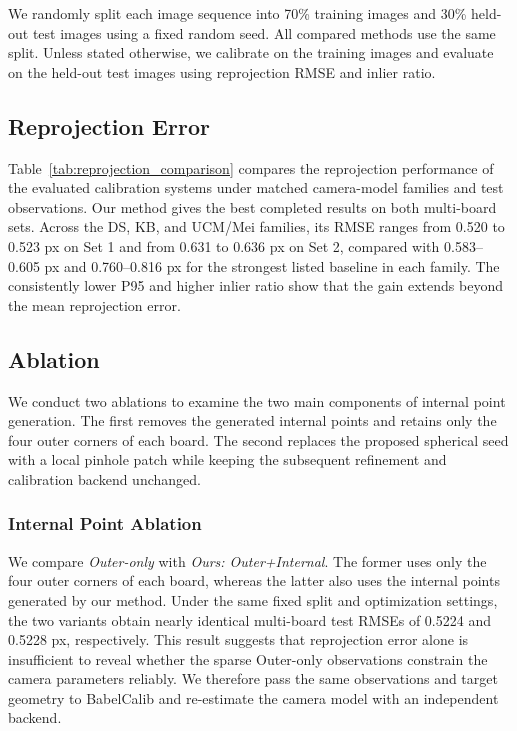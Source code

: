 \documentclass[letterpaper, 10 pt, conference]{ieeeconf}  %
\begin{document}
We randomly split each image sequence into 70\% training images and 30\%
held-out test images using a fixed random seed. All compared methods use the
same split. Unless stated otherwise, we calibrate on the training images and
evaluate on the held-out test images using reprojection RMSE and inlier ratio.

\subsection{Reprojection Error}

Table~\ref{tab:reprojection_comparison} compares the reprojection performance
of the evaluated calibration systems under matched camera-model families and
test observations. Our method gives the best completed results on both
multi-board sets. Across the DS, KB, and UCM/Mei families, its RMSE ranges from
0.520 to 0.523 px on Set 1 and from 0.631 to 0.636 px on Set 2, compared with
0.583--0.605 px and 0.760--0.816 px for the strongest listed baseline in each
family. The consistently lower P95 and higher inlier ratio show that the gain
extends beyond the mean reprojection error.



\subsection{Ablation}

We conduct two ablations to examine the two main components of internal point
generation. The first removes the generated internal points and retains only
the four outer corners of each board. The second replaces the proposed
spherical seed with a local pinhole patch while keeping the subsequent
refinement and calibration backend unchanged.

\subsubsection{Internal Point Ablation}

We compare \emph{Outer-only} with \emph{Ours: Outer+Internal}. The former uses
only the four outer corners of each board, whereas the latter also uses the
internal points generated by our method. Under the same fixed split and
optimization settings, the two variants obtain nearly identical multi-board
test RMSEs of 0.5224 and 0.5228 px, respectively. This result suggests that
reprojection error alone is insufficient to reveal whether the sparse
Outer-only observations constrain the camera parameters reliably. We therefore
pass the same observations and target geometry to BabelCalib and re-estimate
the camera model with an independent backend.
\end{document}
